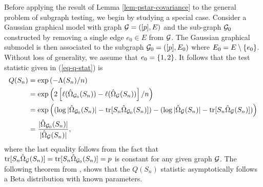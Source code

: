Before applying the result of Lemma \ref{lem-pstar-covariance} to the general problem of subgraph testing, we begin by studying a special case. Consider a Gaussian graphical model with graph ${\mathcal{G}} = ([p], E)$ and the sub-graph ${\mathcal{G}}_0$ constructed by removing a single edge $e_0 \in E$ from ${\mathcal{G}}$. The Gaussian graphical submodel is then associated to the subgraph ${\mathcal{G}}_0 = ([p], E_0)$ where $E_0 = E \setminus {\left\{e_0\right\}}$. Without loss of generality, we assume that $e_0 = {\left\{1,2\right\}}$. It follows that the test statistic given in (\ref{eq-q-stat}) is
\begin{align*}
    Q(S_n) 
    &= \exp\left(-\Lambda(S_n) / n\right)  \\
    &= \exp\left(2 \left[\ell(\hat\Omega_{{\mathcal{G}}_0}(S_n)) - \ell(\hat\Omega_{\mathcal{G}}(S_n))\right] / n\right) \\
    &= \exp\left(
        (\log |\hat\Omega_{{\mathcal{G}}_0}(S_n)| - {\textrm{tr}}[S_n\hat\Omega_{{\mathcal{G}}_0}(S_n)])
        -    
        (\log |\hat\Omega_{\mathcal{G}}(S_n)| - {\textrm{tr}}[S_n\hat\Omega_{\mathcal{G}}(S_n)])\right) \\
    &= \frac{|\hat\Omega_{{\mathcal{G}}_0}(S_n)|}{|\hat\Omega_{{\mathcal{G}}}(S_n)|},
\end{align*}
where the last equality follows from the fact that ${\textrm{tr}}[S_n\hat\Omega_{{\mathcal{G}}}(S_n)] = {\textrm{tr}}[S_n\hat\Omega_{{\mathcal{G}}_0}(S_n)] = p$ is constant for any given graph ${\mathcal{G}}$. The following theorem from \cite[Theorem 3.2]{eriksen1996tests}, shows that the $Q(S_n)$ statistic asymptotically follows a Beta distribution with known parameters.

